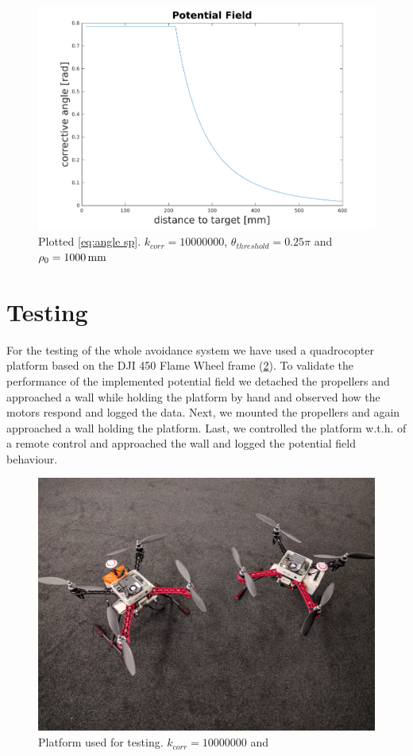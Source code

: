 \begin{figure}
	\centering
	\includegraphics[width=0.8\linewidth]{pictures/plot_pf_matlab.pdf}
	\caption{Plotted \cref{eq:angle sp}. $k_{corr}=10000000$, $\theta_{threshold}=0.25\pi$ and $\rho_0=\unit[1000]{mm}$}
	\label{fig:pf matlab}
\end{figure}


\section{Testing}
For the testing of the whole avoidance system we have used a quadrocopter platform based on the DJI 450 Flame Wheel frame (\cref{fig:loon}). To validate the performance of the implemented potential field we detached the propellers and approached a wall while holding the platform by hand and observed how the motors respond and logged the data. Next, we mounted the propellers and again approached a wall holding the platform. Last, we controlled the platform w.t.h. of a remote control and approached the wall and logged the potential field behaviour.  
\begin{figure}
	\centering
	\includegraphics[width=0.8\linewidth]{pictures/loons.jpg}
	\caption{Platform used for testing. $k_{corr}=10000000$ and}
	\label{fig:loon}
\end{figure}